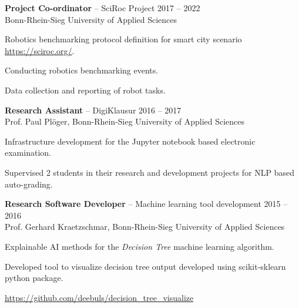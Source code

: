 \documentclass{article}
\newcommand{\employer}[4]{{
\vspace*{2pt}%
\textbf{#1} #2 \hfill #3\\ #4 \vspace*{2pt}}
}
\renewcommand{\labelitemii}{
	\raisebox{0.3ex}{\tiny\textbullet}
}
\newenvironment{bullet-list-minor}{
\begin{list}{\labelitemii}{\setlength\leftmargin{15pt} 
\topsep 0pt \itemsep -2pt}}{\vspace*{4pt}\end{list}
}
\begin{document}
    \employer{Project Co-ordinator}{-- SciRoc Project}{2017 -- 2022}
    {Bonn-Rhein-Sieg University of Applied Sciences}
	\begin{bullet-list-minor}
	\item Robotics benchmarking protocol definition for smart city scenario \url{https://sciroc.org/}. 
    \item Conducting robotics benchmarking events.
    \item Data collection and reporting of robot tasks.
    \end{bullet-list-minor}
    

    \employer{Research Assistant}{-- DigiKlausur}{2016 -- 2017}
    {Prof. Paul Pl\"{o}ger, Bonn-Rhein-Sieg University of Applied Sciences}
    \begin{bullet-list-minor}
    \item Infrastructure development for the Jupyter notebook based electronic examination.
    \item Supervised 2 students in their research and development projects for NLP based auto-grading.
    \end{bullet-list-minor}


    \employer{Research Software Developer}{-- Machine learning tool development}{2015 -- 2016}
    {Prof. Gerhard Kraetzschmar, Bonn-Rhein-Sieg University of Applied Sciences}
    \begin{bullet-list-minor}
    \item Explainable AI methods for the \emph{Decision Tree} machine learning algorithm.
    \item Developed tool to visualize decision tree output developed using scikit-sklearn python package.
    \item \url{https://github.com/deebuls/decision\_tree\_visualize}
    \end{bullet-list-minor}
\end{document}
